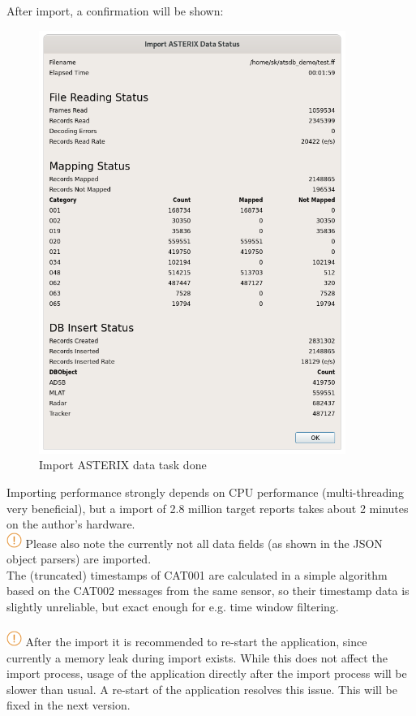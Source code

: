 After import, a confirmation will be shown:

\begin{figure}[H]
  \center
    \includegraphics[width=10cm]{../screenshots/asterix_import_done.png}
  \caption{Import ASTERIX data task done}
\end{figure}

Importing performance strongly depends on CPU performance (multi-threading very beneficial), but a import of 2.8 million target reports takes about 2 minutes on the author's hardware. \\

\includegraphics[width=0.5cm]{../../data/icons/hint.png} Please also note the currently not all data fields (as shown in the JSON object parsers) are imported.\\

The (truncated) timestamps of CAT001 are calculated in a simple algorithm based on the CAT002 messages from the same sensor, so their timestamp data is slightly unreliable, but exact enough for e.g. time window filtering. \\\\

\includegraphics[width=0.5cm]{../../data/icons/hint.png} After the import it is recommended to re-start the application, since currently a memory leak during import exists. While this does not affect the import process, usage of the application directly after the import process will be slower than usual. A re-start of the application resolves this issue. This will be fixed in the next version. \\ 
